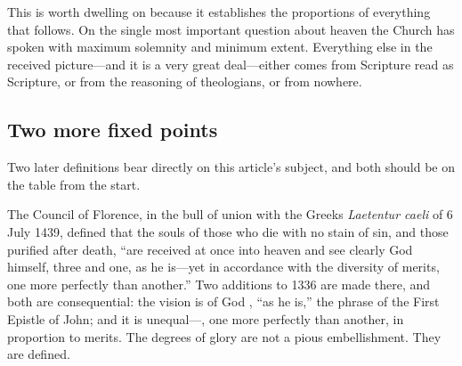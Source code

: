 This is worth dwelling on because it establishes the proportions of everything that follows. On the single most important question about heaven the Church has spoken with maximum solemnity and minimum extent. Everything else in the received picture---and it is a very great deal---either comes from Scripture read as Scripture, or from the reasoning of theologians, or from nowhere.

\subsection{Two more fixed points}

Two later definitions bear directly on this article's subject, and both should be on the table from the start.

The Council of Florence, in the bull of union with the Greeks \emph{Laetentur caeli} of 6 July 1439, defined that the souls of those who die with no stain of sin, and those purified after death, ``are received at once into heaven and see clearly God himself, three and one, as he is---yet in accordance with the diversity of merits, one more perfectly than another.'' Two additions to 1336 are made there, and both are consequential: the vision is of God , ``as he is,'' the phrase of the First Epistle of John; and it is unequal---, one more perfectly than another, in proportion to merits. The degrees of glory are not a pious embellishment. They are defined.

